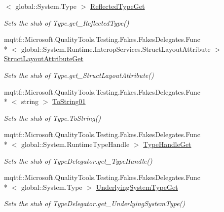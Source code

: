 \begin{DoxyCompactItemize}
$<$ global\-::\-System.\-Type $>$ \hyperlink{class_system_1_1_reflection_1_1_fakes_1_1_stub_type_delegator_a855e96c54b8df341da23e9bcc9655304}{Reflected\-Type\-Get}
\begin{DoxyCompactList}\small\item\em Sets the stub of Type.\-get\-\_\-\-Reflected\-Type()\end{DoxyCompactList}\item 
mqttf\-::\-Microsoft.\-Quality\-Tools.\-Testing.\-Fakes.\-Fakes\-Delegates.\-Func\\*
$<$ global\-::\-System.\-Runtime.\-Interop\-Services.\-Struct\-Layout\-Attribute $>$ \hyperlink{class_system_1_1_reflection_1_1_fakes_1_1_stub_type_delegator_a6e6bf099e556a94d430ec416f5173410}{Struct\-Layout\-Attribute\-Get}
\begin{DoxyCompactList}\small\item\em Sets the stub of Type.\-get\-\_\-\-Struct\-Layout\-Attribute()\end{DoxyCompactList}\item 
mqttf\-::\-Microsoft.\-Quality\-Tools.\-Testing.\-Fakes.\-Fakes\-Delegates.\-Func\\*
$<$ string $>$ \hyperlink{class_system_1_1_reflection_1_1_fakes_1_1_stub_type_delegator_a6db23643469919668de414ba8144c7fa}{To\-String01}
\begin{DoxyCompactList}\small\item\em Sets the stub of Type.\-To\-String()\end{DoxyCompactList}\item 
mqttf\-::\-Microsoft.\-Quality\-Tools.\-Testing.\-Fakes.\-Fakes\-Delegates.\-Func\\*
$<$ global\-::\-System.\-Runtime\-Type\-Handle $>$ \hyperlink{class_system_1_1_reflection_1_1_fakes_1_1_stub_type_delegator_a3c2584bce642a42722469ae2293d0d01}{Type\-Handle\-Get}
\begin{DoxyCompactList}\small\item\em Sets the stub of Type\-Delegator.\-get\-\_\-\-Type\-Handle()\end{DoxyCompactList}\item 
mqttf\-::\-Microsoft.\-Quality\-Tools.\-Testing.\-Fakes.\-Fakes\-Delegates.\-Func\\*
$<$ global\-::\-System.\-Type $>$ \hyperlink{class_system_1_1_reflection_1_1_fakes_1_1_stub_type_delegator_aa95dd315795e8fd2ce51f49d0c87bb97}{Underlying\-System\-Type\-Get}
\begin{DoxyCompactList}\small\item\em Sets the stub of Type\-Delegator.\-get\-\_\-\-Underlying\-System\-Type()\end{DoxyCompactList}\end{DoxyCompactItemize}
